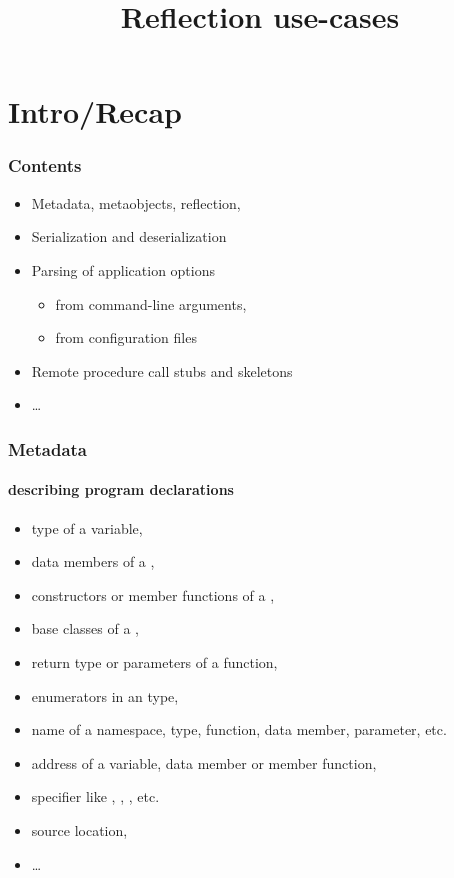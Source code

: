 \documentclass[compress,table,xcolor=table]{beamer}
\begin{document}
\title{Reflection use-cases}
\section{Intro/Recap}
\frame{\titlepage}
\begin{frame}
  \frametitle{Contents}
  \begin{itemize}
    \item Metadata, metaobjects, reflection, 
    \item Serialization and deserialization
    \item Parsing of application options 
    \begin{itemize}
      \smaller
      \item from command-line arguments,
      \item from configuration files
    \end{itemize}
    \item Remote procedure call stubs and skeletons
    \item \ldots
  \end{itemize}
\end{frame}
\begin{frame}
  \frametitle{Metadata}
  \framesubtitle{describing program declarations}
  \larger
  \begin{itemize}
    \item type of a variable,
    \item data members of a ,
    \item constructors or member functions of a ,
    \item base classes of a ,
    \item return type or parameters of a function,
    \item enumerators in an  type,
    \item name of a namespace, type, function, data member, parameter, etc.
    \item address of a variable, data member or member function,
    \item specifier like , ,
      , etc.
    \item source location,
    \item \ldots
  \end{itemize}
\end{frame}
\end{document}
